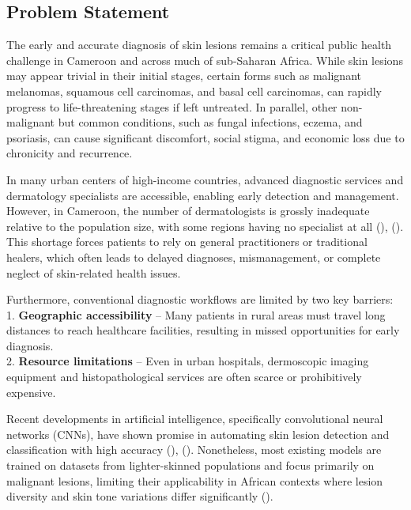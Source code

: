 \documentclass[
  12pt,
  oneside]{article}
\begin{document}
\subsection{Problem Statement}\label{problem-statement}

The early and accurate diagnosis of skin lesions remains a critical
public health challenge in Cameroon and across much of sub-Saharan
Africa. While skin lesions may appear trivial in their initial stages,
certain forms such as malignant melanomas, squamous cell carcinomas, and
basal cell carcinomas, can rapidly progress to life-threatening stages
if left untreated. In parallel, other non-malignant but common
conditions, such as fungal infections, eczema, and psoriasis, can cause
significant discomfort, social stigma, and economic loss due to
chronicity and recurrence.

In many urban centers of high-income countries, advanced diagnostic
services and dermatology specialists are accessible, enabling early
detection and management. However, in Cameroon, the number of
dermatologists is grossly inadequate relative to the population size,
with some regions having no specialist at all
(),
(). This shortage
forces patients to rely on general practitioners or traditional healers,
which often leads to delayed diagnoses, mismanagement, or complete
neglect of skin-related health issues.

Furthermore, conventional diagnostic workflows are limited by two key
barriers:\\
1. \textbf{Geographic accessibility} -- Many patients in rural areas
must travel long distances to reach healthcare facilities, resulting in
missed opportunities for early diagnosis.\\
2. \textbf{Resource limitations} -- Even in urban hospitals, dermoscopic
imaging equipment and histopathological services are often scarce or
prohibitively expensive.

Recent developments in artificial intelligence, specifically
convolutional neural networks (CNNs), have shown promise in automating
skin lesion detection and classification with high accuracy
(),
(). Nonetheless,
most existing models are trained on datasets from lighter-skinned
populations and focus primarily on malignant lesions, limiting their
applicability in African contexts where lesion diversity and skin tone
variations differ significantly ().
\end{document}
